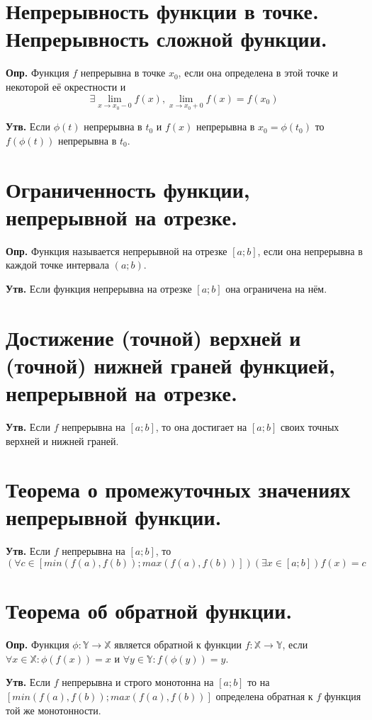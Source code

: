 \documentclass[a4paper,12pt]{article}
\begin{document}
\begin{flushleft}
\section{Непрерывность функции в точке. Непрерывность сложной функции.}

	\textbf{Опр.} Функция $f$ непрерывна в точке $x_0$, если она определена в этой точке и некоторой её окрестности и $$\exists \lim_{x \to x_0 - 0} f(x), \lim_{x \to x_0 + 0} f(x) = f(x_0)$$
	
    \textbf{Утв.} Если $\phi(t)$ непрерывна в $t_0$ и $f(x)$ непрерывна в $x_0 = \phi(t_0)$ то $f(\phi(t))$ непрерывна в $t_0$.
    
\section{Ограниченность функции, непрерывной на отрезке.}

	\textbf{Опр.} Функция называется непрерывной на отрезке $[a; b]$, если она непрерывна в каждой точке интервала $(a; b)$.
    
    \textbf{Утв.} Если функция непрерывна на отрезке $[a; b]$ она ограничена на нём.
	
\section{Достижение (точной) верхней и (точной) нижней граней функцией, непрерывной на отрезке.}

	\textbf{Утв.} Если $f$ непрерывна на $[a;b]$, то она достигает на $[a;b]$ своих точных верхней и нижней граней.
	
\section{Теорема о промежуточных значениях непрерывной функции.}

	\textbf{Утв.} Если $f$ непрерывна на $[a;b]$, то $(\forall c \in [min(f(a), f(b)); max(f(a), f(b))]) (\exists x \in [a; b]) f(x) = c$
	
\section{Теорема об обратной функции.}

    \textbf{Опр.} Функция $\phi: \mathbb{Y} \rightarrow \mathbb{X}$ является обратной к функции $f: \mathbb{X} \rightarrow \mathbb{Y}$, если $\forall x \in \mathbb{X}: \phi(f(x)) = x$ и $\forall y \in \mathbb{Y}: f(\phi(y)) = y$.
    
    \textbf{Утв.} Если $f$ непрерывна и строго монотонна на $[a;b]$ то на $[min(f(a), f(b)); max(f(a), f(b))]$ определена обратная к $f$ функция той же монотонности.

\end{flushleft}
\end{document}
